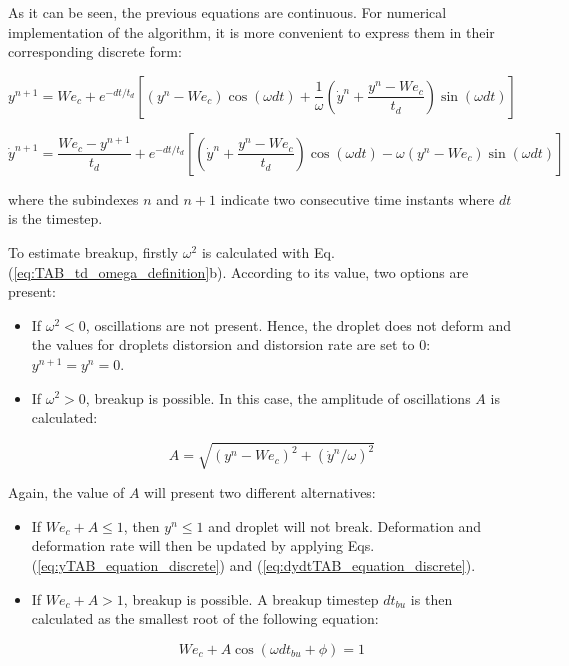 As it can be seen, the previous equations are continuous. For numerical implementation of the algorithm, it is more convenient to express them in their corresponding discrete form:

\begin{equation}
\label{eq:yTAB_equation_discrete}
y^{n+1} = We_c + e^{- dt / t_d} \left[ \left( y^n - We_c \right) \cos \left( \omega dt \right) + \frac{1}{\omega}\left( \dot{y}^n + \frac{y^n - We_c}{t_d} \right) \sin \left( \omega dt \right)   \right]
\end{equation}

\begin{equation}
\label{eq:dydtTAB_equation_discrete}
\dot{y}^{n+1} = \frac{We_c - y^{n+1} }{t_d} + e^{- dt / t_d} \left[ \left( \dot{y}^n + \frac{y^n - We_c}{t_d} \right) \cos \left( \omega dt \right) - \omega \left( y^n - We_c \right) \sin \left( \omega dt \right)  \right]
\end{equation}

where the subindexes $n$ and $n+1$ indicate two consecutive time instants where $dt$ is the timestep. 

To estimate breakup, firstly $\omega^2$ is calculated with Eq. (\ref{eq:TAB_td_omega_definition}b). According to its value, two options are present:

\begin{itemize}

	\item If $\omega^2 < 0$, oscillations are not present. Hence, the droplet does not deform and the values for droplets distorsion and distorsion rate are set to $0$: $y^{n+1} = y^n = 0$.
	
	\item If $\omega^2 > 0$, breakup is possible. In this case, the amplitude of oscillations $A$ is calculated:
	
	\begin{equation}
	A = \sqrt{\left( y^n - We_c \right)^2 + \left( \dot{y}^n / \omega \right)^2}
	\end{equation}

\end{itemize}

Again, the value of $A$ will present two different alternatives:

\begin{itemize}

	\item If $We_c + A \leq 1$, then $y^n \leq 1$ and droplet will not break. Deformation and deformation rate will then be updated by applying Eqs. (\ref{eq:yTAB_equation_discrete}) and (\ref{eq:dydtTAB_equation_discrete}).
	
	\item If $We_c + A > 1$, breakup is possible. A breakup timestep $dt_{bu}$ is then calculated as the smallest root of the following equation:
	
	\begin{equation}
	\label{eq:TAB_dtbu_obtention}
	We_c + A \cos \left( \omega dt_{bu} + \phi  \right) = 1
	\end{equation}

\end{itemize}

